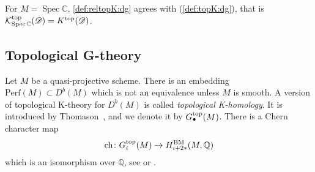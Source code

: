 \documentclass [11pt,oneside,a4paper,mathscr]{amsart}
\theoremstyle{definition}
\newcommand{\Spec}{\operatorname{Spec}}
\newcommand{\ch}{\operatorname{ch}}
\begin{document}
For $M=\Spec \mathbb{C}$, 
\eqref{def:reltopK:dg} 
agrees with (\ref{def:topK:dg}), that is
$\mathcal{K}_{\mathrm{Spec}\,\mathbb{C}}^{\rm{top}}(\mathscr{D})=K^{\rm{top}}(\mathscr{D})$. 

\subsection{Topological G-theory}\label{subsec:topG}
Let $M$ be a quasi-projective scheme. 
There is an embedding $\mathrm{Perf}(M) \subset D^b(M)$ which 
is not an equivalence unless $M$ is smooth. 
A version of topological K-theory for $D^b(M)$ is 
called \textit{topological K-homology}. It is 
introduced by Thomason~\cite{ThomasonAS}, 
and we denote it by $G^{\rm{top}}_{\bullet}(M)$. 
There is a Chern character map 
\begin{align}\label{ch:Gtheory}
    \ch \colon G_i^{\rm{top}}(M) \to H^{\mathrm{BM}}_{i+2\ast}(M, \mathbb{Q})
\end{align}
which is an isomorphism over $\mathbb{Q}$, 
see \cite[Section 3.6 and Section 6]{MR2762553} or \cite[Section 11]{MR0679698}. 
\end{document}
